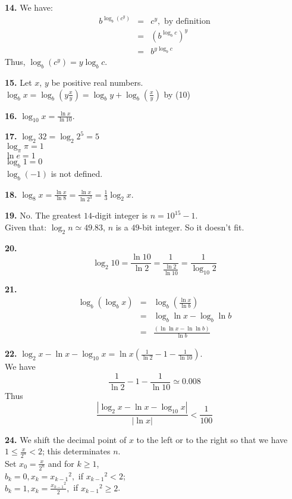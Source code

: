 \documentclass[a4paper,12pt]{article}
\newcommand{\newpar}[1]{\bigskip \noindent \textbf{#1.}}
\begin{document}
\newpar{14} We have:
\begin{eqnarray*}
b^{\log_b(c^y)} & = & c^y, \mbox{ by definition}\\
&=& (b^{\log_bc})^y\\
&=& b^{y \log_b c}
\end{eqnarray*}
Thus, $\log_b(c^y) = y \log_b c$.

\newpar{15} Let $x$, $y$ be positive real numbers.\\
$\log_bx = \log_b(y \frac{x}{y}) = \log_by + \log_b(\frac{x}{y})$ by (10)

\newpar{16} $\log_{10} x = \frac{\ln x}{\ln 10}$.

\newpar{17} $\log_2 32 = \log_2 2^5 = 5$\\
$\log_{\pi}\pi = 1$\\
$\ln e =  1$\\
$\log_b 1 = 0$\\
$\log_b(-1)$ is not defined.

\newpar{18} $\log_8 x = \frac{\ln x}{\ln 8} = \frac{\ln x}{\ln 2^3} =
\frac{1}{3} \log_2 x$.

\newpar{19} No. The greatest $14$-digit integer is $n = 10^{15} - 1$.\\
Given that: $\log_2 n \simeq 49.83$, $n$ is a $49$-bit integer.  So it
doesn't fit.

\newpar{20} \[ \log_2 10 = \frac{\ln 10}{\ln 2} = 
\frac{1}{\frac{\ln 2}{\ln 10}} = \frac{1}{\log_{10}2}\]

\newpar{21} 
\begin{eqnarray*}
\log_b(\log_b x) &=& \log_b\left(\frac{\ln x}{\ln b}\right)\\&=&
\log_b \ln x - \log_b \ln b\\&=&
\frac{(\ln \ln x - \ln \ln b)}{\ln b}
\end{eqnarray*}

\newpar{22} $\log_2 x - \ln x - \log_{10} x = \ln x (\frac{1}{\ln 2} - 1 -
\frac{1}{\ln 10})$.\\
We have
\[\frac{1}{\ln 2} - 1 - \frac{1}{\ln 10} \simeq 0.008 \]
Thus
\[ \frac{|\log_2 x - \ln x - \log_{10} x|}{|\ln x|} < \frac{1}{100}\]

\newpar{24} We shift the decimal point of $x$ to the left or to the right 
so that we have $1 \le \frac{x}{2^n} < 2$; this determinates $n$.\\
Set $x_0 = \frac{x}{2^n}$ and for $k \ge 1$,\\
$b_k = 0, x_k = x_{k-1}{}^2,$ if $x_{k-1}{}^2 < 2$;\\
$b_k = 1, x_k = \frac{x_{k-1}{}^2}{2},$ if $x_{k-1}{}^2 \ge 2$.
\end{document}

